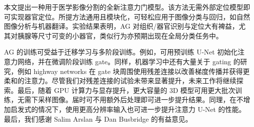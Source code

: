 \documentclass{article}
\begin{document}
本文提出一种用于医学影像分割的全新注意力门模型。该方法无需外部定位模型即可实现器官定位。所提方法通用且模块化，可轻松应用于图像分类与回归，如自然图像分析与机器翻译。实验结果表明，AG 对组织/器官识别与定位大有裨益，尤其对胰腺等尺寸可变的小器官，类似行为亦预期出现在全局分类任务中。 

AG 的训练可受益于迁移学习与多阶段训练。例如，可用预训练 U-Net 初始化注意力网络，并在微调阶段训练 gate。同样，机器学习中还有大量关于 gating 的研究，例如 highway networks \cite{greff2016highway} 在 gate 块周围使用残差连接以改善梯度传播并获得更柔和的注意力。尽管我们对残差连接的试验未带来显著提升，未来工作将继续探索。最后，随着 GPU 计算力与显存提升，更大容量的 3D 模型可用更大批次训练，无需下采样图像。届时可不用额外后处理即可进一步提升结果。同理，在不增加启发式的情况下，使用更高分辨率输入也可进一步提升注意力 U-Net 的性能。最后，我们感谢 Salim Arslan 与 Dan Busbridge 的有益意见。 



\end{document}
